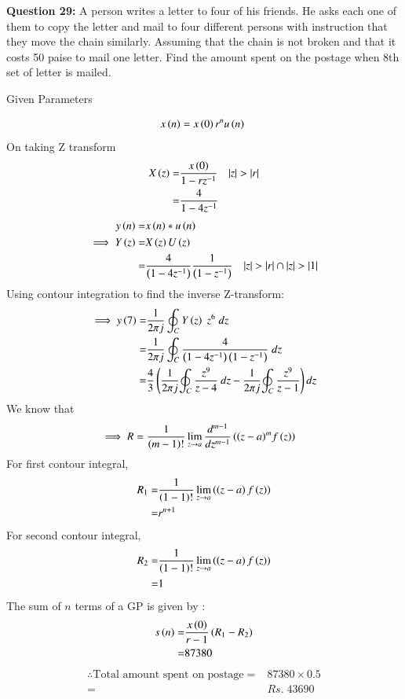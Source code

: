 \documentclass[journal,12pt,twocolumn]{IEEEtran}
\theoremstyle{remark}
\begin{document}
\textbf{Question 29: }A person writes a letter to four of his friends. He asks each one of them to copy the letter and mail to four different persons with instruction that they move the chain similarly. Assuming that the chain is not broken and that it costs 50 paise to mail one letter. Find the amount spent on the postage when 8th set of letter is mailed.\\
\begin{table}[!h]
	\centering
	
	\vspace{6 pt}
	\caption{Given Parameters}
	\label{tab:enter-label}
\end{table}
\begin{align}
x\left(n\right)=x\left(0\right)r^nu\left(n\right)\
\end{align}
On taking Z transform
\begin{align}
X\brak{z}=&\dfrac{x\brak{0}}{1-rz^{-1}}  \quad |z|>|r|\\
 		 =&\dfrac{4}{1-4z^{-1}}
\end{align}
\begin{align}
y\brak{n} =& x\brak{n}* u\brak{n}\\
\implies Y\brak{z} =& X\brak{z} U\brak{z}\\
                   =& \dfrac{4}{\brak{1-4z^{-1}}}\dfrac{1}{\brak{1-z^{-1}}} \quad |z|>|r| \cap |z|>|1|    
\end{align}
Using contour integration to find the inverse Z-transform:\\
\begin{align}
    \implies y\left(7\right)=&\dfrac{1}{2\pi j}\oint_{C}Y\left(z\right) \;z^{6} \;dz\\
    =&\dfrac{1}{2\pi j}\oint_{C}\dfrac{4}{\left(1-4z^{-1}\right)\left(1-z^{-1}\right)}\;dz \\
    =&\dfrac{4}{3} \left(\frac{1}{2\pi j} {\oint_C \dfrac{z^{9}}{z - 4} \:dz -  \frac{1}{2\pi j}{\oint_C \frac{z^{9}}{z - 1}}}\right) dz
\end{align}
We know that 
\begin{align}
    \implies R&=\dfrac{1}{\left(m-1\right)!}\lim\limits_{z\to a}\dfrac{d^{m-1}}{dz^{m-1}}\left({\left(z-a\right)}^{m}f\left(z\right)\right)  
\end{align}
For first contour integral,
\begin{align}
R_1 =& \frac{1}{\left(1 - 1\right)!} \lim_{z \to a} \left(\left(z - a\right)f\left(z\right)\right)\\
	=& r^{n+1}
\end{align}
For second contour integral,
\begin{align}
R_2 =& \frac{1}{\left(1 - 1\right)!} \lim_{z \to a} \left(\left(z - a\right)f\left(z\right)\right)\\
	=& 1
\end{align}
The sum of $n$ terms of a GP is given by :
\begin{align}
s\left(n\right)=&\dfrac{x\left(0\right)}{r-1} \left(R_1 -R_2\right)\\
		 =& 87380\\
\end{align}
\begin{align}
\therefore \text{Total amount spent on postage}=& 87380 \times 0.5 \\ 
             =& Rs.\; 43690
\end{align}
\end{document}
